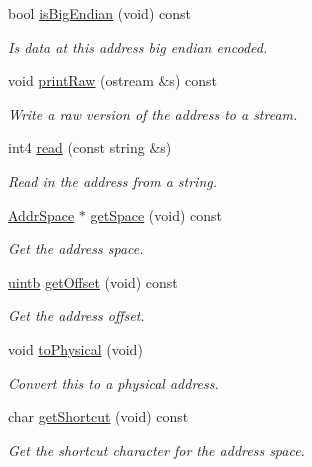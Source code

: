 \begin{DoxyCompactItemize}
bool \mbox{\hyperlink{class_address_aec0c5e9a64d45b7e913e61eb064bcc2d}{is\+Big\+Endian}} (void) const
\begin{DoxyCompactList}\small\item\em Is data at this address big endian encoded. \end{DoxyCompactList}\item 
void \mbox{\hyperlink{class_address_abc8be0370dd8397596c06a5f68bcc8e8}{print\+Raw}} (ostream \&s) const
\begin{DoxyCompactList}\small\item\em Write a raw version of the address to a stream. \end{DoxyCompactList}\item 
int4 \mbox{\hyperlink{class_address_a10953bd3fe65b279ee102a69d43e2d27}{read}} (const string \&s)
\begin{DoxyCompactList}\small\item\em Read in the address from a string. \end{DoxyCompactList}\item 
\mbox{\hyperlink{class_addr_space}{Addr\+Space}} $\ast$ \mbox{\hyperlink{class_address_a2e1cbf153126eebf5ba92f52c5dbc6a8}{get\+Space}} (void) const
\begin{DoxyCompactList}\small\item\em Get the address space. \end{DoxyCompactList}\item 
\mbox{\hyperlink{types_8h_a2db313c5d32a12b01d26ac9b3bca178f}{uintb}} \mbox{\hyperlink{class_address_a208ce07ecf27e5c148d8395913831c2a}{get\+Offset}} (void) const
\begin{DoxyCompactList}\small\item\em Get the address offset. \end{DoxyCompactList}\item 
void \mbox{\hyperlink{class_address_a5dfb849ac01e7b1ca87d0ecbf5022dca}{to\+Physical}} (void)
\begin{DoxyCompactList}\small\item\em Convert this to a physical address. \end{DoxyCompactList}\item 
char \mbox{\hyperlink{class_address_a00559098470f2e6da27c07cdda47d1ea}{get\+Shortcut}} (void) const
\begin{DoxyCompactList}\small\item\em Get the shortcut character for the address space. \end{DoxyCompactList}\item 

\end{DoxyCompactItemize}

